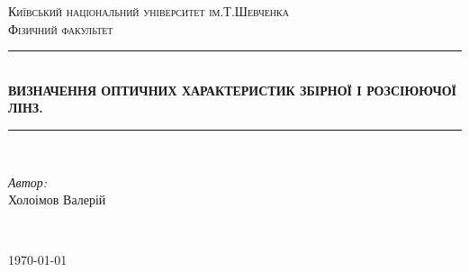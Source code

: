 \center
\newcommand{\HRule}{\rule{\linewidth}{0.3 mm}} %
\textsc{\Large Київський національний університет ім.Т.Шевченка }\\[1.5cm] %
\textsc{\Large Фізичний факультет}\\[2.5cm] %


\HRule \\[0.4cm]
{ \huge \bfseries ВИЗНАЧЕННЯ ОПТИЧНИХ ХАРАКТЕРИСТИК
ЗБІРНОЇ І РОЗСІЮЮЧОЇ ЛІНЗ.
}\\[0.4cm] %
\HRule \\[1.5cm]

\flushright
\begin{minipage}{0.4\textwidth}
\large
\emph{Автор:}\\ Холоімов Валерій %
\end{minipage}\\[12cm]
\center

{\large \today}\\[0cm] %
\flushleft
